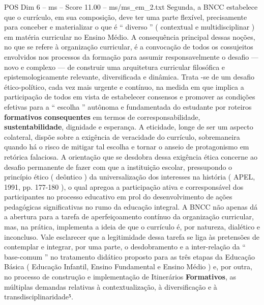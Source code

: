 \begin{textsample}{POS Dim 6 – ms – Score 11.00 – ms/ms\_em\_2.txt}
Segunda, a BNCC estabelece que o currículo, em sua composição, deve ter uma parte flexível, precisamente para conceber e materializar o que é “ diverso ” ( contextual e multidisciplinar ) em matéria curricular no Ensino Médio.
A consequência principal dessas noções, no que se refere à organização curricular, é a convocação de todos os cossujeitos envolvidos nos processos da formação para assumir responsavelmente o desafio — novo e complexo — de construir uma arquitetura curricular filosófica e epistemologicamente relevante, diversificada e dinâmica.
Trata -se de um desafio ético-político, cada vez mais urgente e contínuo, na medida em que implica a participação de todos em vista de estabelecer consensos e promover as condições efetivas para a “ escolha ” autônoma e fundamentada do estudante por roteiros \textbf{formativos} \textbf{consequentes} em termos de corresponsabilidade, \textbf{sustentabilidade}, dignidade e esperança.
A eticidade, longe de ser um aspecto colateral, dispõe sobre a exigência de veracidade do currículo, sobremaneira quando há o risco de mitigar tal escolha e tornar o anseio de protagonismo em retórica falaciosa.
A orientação que se desdobra dessa exigência ética concerne ao desafio permanente de fazer com que a instituição escolar, pressupondo o princípio ético ( deôntico ) da universalização dos interesses na história ( APEL, 1991, pp. 177-180 ), o qual apregoa a participação ativa e corresponsável dos participantes no processo educativo em prol do desenvolvimento de ações pedagógicas significativas no rumo da educação integral.
A BNCC não apenas dá a abertura para a tarefa de aperfeiçoamento contínuo da organização curricular, mas, na prática, implementa a ideia de que o currículo é, por natureza, dialético e inconcluso.
Vale esclarecer que a legitimidade dessa tarefa se liga às pretensões de contemplar e integrar, por uma parte, o desdobramento e a inter-relação da “ base-comum ” no tratamento didático proposto para as três etapas da Educação Básica ( Educação Infantil, Ensino Fundamental e Ensino Médio ) e, por outra, no processo de construção e implementação de Itinerários \textbf{Formativos}, as múltiplas demandas relativas à contextualização, à diversificação e à transdisciplinaridade⁵.

\end{textsample}
